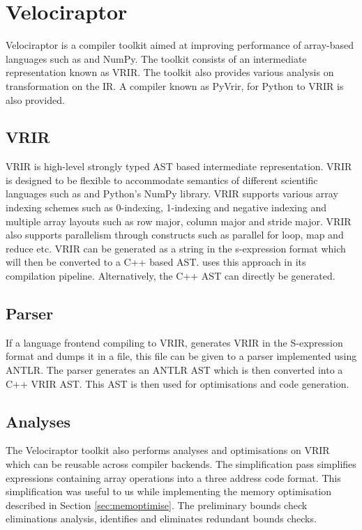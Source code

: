 \section{Velociraptor}
Velociraptor is a compiler toolkit aimed at improving performance of array-based languages such as \matlab and NumPy. The toolkit consists of an intermediate representation known as VRIR. The toolkit also provides various analysis on transformation on the IR. A compiler known as PyVrir, for Python to VRIR is also provided. 
\subsection{VRIR}
VRIR is high-level strongly typed AST based intermediate representation. VRIR is designed to be flexible to accommodate semantics of different scientific languages such as \matlab and Python's NumPy library. VRIR supports various array indexing schemes such as 0-indexing, 1-indexing and negative indexing and multiple array layouts such as row major, column major and stride major. VRIR also supports parallelism through constructs such as parallel for loop, map and reduce etc. VRIR can be generated as a string in the s-expression format which will then be converted to a C++ based AST. \velocty uses this approach in its compilation pipeline. Alternatively, the C++ AST can directly be generated.

\subsection{Parser}
If a language frontend compiling to VRIR, generates VRIR in the S-expression format and dumps it in a file, this file can be given to a parser implemented using ANTLR\cite{antlr}. The parser generates an ANTLR AST which is then converted into a C++ VRIR AST. This AST is then used for optimisations and code generation.  
\subsection{Analyses}
The Velociraptor toolkit also performs analyses and optimisations on VRIR which  can be reusable across compiler backends. The simplification pass simplifies expressions containing array operations into a three address code format. This simplification was useful to us while implementing the memory optimisation described in Section \ref{sec:memoptimise}. The preliminary bounds check eliminations analysis, identifies and eliminates redundant bounds checks.
